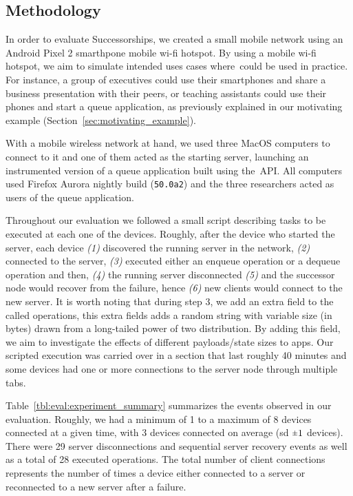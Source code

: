 \subsection{Methodology}
\label{sub:eval:evaluation_methodology}

In order to evaluate Successorships, we created a small mobile network using an Android Pixel 2 smarthpone mobile wi-fi hotspot.
By using a mobile wi-fi hotspot, we aim to simulate intended uses cases where~\APIName could be used in practice.
For instance, a group of executives could use their smartphones and share a business presentation with their peers, or teaching assistants could use their phones and start a queue application, as previously explained in our motivating example (Section~\ref{sec:motivating_example}).


With a mobile wireless network at hand, we used three MacOS computers to connect to it and one of them acted as the starting server, launching an instrumented version of a queue application built using the~\APIName API. 
All computers used Firefox Aurora nightly build ({\texttt{50.0a2}}) and the three researchers acted as users of the queue application.


Throughout our evaluation we followed a small script describing tasks to be executed at each one of the devices. 
Roughly, after the device who started the server, each device
{\it (1)} discovered the running server in the network,
{\it (2)} connected to the server,
{\it (3)} executed either an enqueue operation or a dequeue operation and then, 
{\it (4)} the running server disconnected
{\it (5)} and the successor node would recover from the failure, hence
{\it (6)} new clients would connect to the new server.
It is worth noting that during step 3, we add an extra field to the called operations, this extra fields adds a random string with variable size (in bytes) drawn from a long-tailed power of two distribution. 
By adding this field, we aim to investigate the effects of different payloads/state sizes to \APIName apps.
Our scripted execution was carried over in a section that last roughly 40 minutes and some devices had one or more connections to the server node through multiple tabs.


Table~\ref{tbl:eval:experiment_summary} summarizes the events observed in our evaluation.
Roughly, we had a minimum of 1 to a maximum of 8 devices connected at a given time, with 3 devices connected on average (sd $\rpm 1$ devices). 
There were 29 server disconnections and sequential server recovery events as well as a total of  28 executed operations. 
The total number of client connections represents the number of times a device either connected to a server or reconnected to a new server after a failure.


